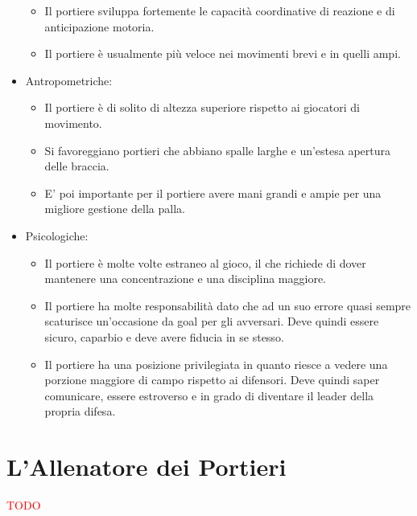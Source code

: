 \documentclass[../uefaC.tex]{subfiles}
\begin{document}
\begin{itemize}
\begin{itemize}
            \item Il portiere sviluppa fortemente le capacità coordinative di reazione e di anticipazione motoria.
            \item Il portiere è usualmente più veloce nei movimenti brevi e in quelli ampi.
        \end{itemize}
    \item Antropometriche:
        \begin{itemize}
            \item Il portiere è di solito di altezza superiore rispetto ai giocatori di movimento.
            \item Si favoreggiano portieri che abbiano spalle larghe e un'estesa apertura delle braccia.
            \item E' poi importante per il portiere avere mani grandi e ampie per una migliore gestione della palla.
        \end{itemize}
    \item Psicologiche:
        \begin{itemize}
            \item Il portiere è molte volte estraneo al gioco, il che richiede di dover mantenere una concentrazione e una disciplina maggiore.
            \item Il portiere ha molte responsabilità dato che ad un suo errore quasi sempre scaturisce un'occasione da goal per gli avversari. Deve quindi essere sicuro, caparbio e deve avere fiducia in se stesso.
            \item Il portiere ha una posizione privilegiata in quanto riesce a vedere una porzione maggiore di campo rispetto ai difensori. Deve quindi saper comunicare, essere estroverso e in grado di diventare il leader della propria difesa.
        \end{itemize}
\end{itemize}

\section{L'Allenatore dei Portieri}
\textcolor{red}{TODO}
\end{document}
